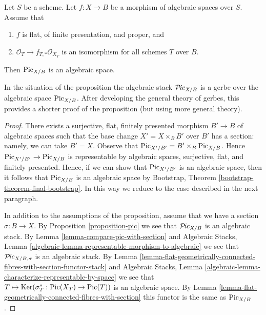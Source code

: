 \begin{proposition}
\label{proposition-pic-functor}
Let $S$ be a scheme. Let $f : X \to B$ be a morphism of algebraic
spaces over $S$. Assume that
\begin{enumerate}
\item $f$ is flat, of finite presentation, and proper, and
\item $\mathcal{O}_T \to f_{T, *}\mathcal{O}_{X_T}$ is an isomorphism
for all schemes $T$ over $B$.
\end{enumerate}
Then $\mathrm{Pic}_{X/B}$ is an algebraic space.
\end{proposition}

\noindent
In the situation of the proposition the algebraic stack
$\mathcal{P}\!\mathit{ic}_{X/B}$ is a gerbe over the algebraic space
$\mathrm{Pic}_{X/B}$. After developing the general
theory of gerbes, this provides a shorter proof of
the proposition (but using more general theory).

\begin{proof}
There exists a surjective, flat, finitely presented morphism
$B' \to B$ of algebraic spaces such that the base change $X' = X \times_B B'$
over $B'$ has a section: namely, we can take $B' = X$.
Observe that $\mathrm{Pic}_{X'/B'} = B' \times_B \mathrm{Pic}_{X/B}$.
Hence $\mathrm{Pic}_{X'/B'} \to \mathrm{Pic}_{X/B}$ is representable
by algebraic spaces, surjective, flat, and finitely presented.
Hence, if we can show that $\mathrm{Pic}_{X'/B'}$ is an algebraic space,
then it follows that $\mathrm{Pic}_{X/B}$
is an algebraic space by Bootstrap, Theorem
\ref{bootstrap-theorem-final-bootstrap}.
In this way we reduce to the case described in the next paragraph.

\medskip\noindent
In addition to the assumptions of the proposition, assume that
we have a section $\sigma : B \to X$. By
Proposition \ref{proposition-pic} we see that
$\mathcal{P}\!\mathit{ic}_{X/B}$ is an algebraic stack.
By Lemma \ref{lemma-compare-pic-with-section} and
Algebraic Stacks, Lemma
\ref{algebraic-lemma-representable-morphism-to-algebraic}
we see that $\mathcal{P}\!\mathit{ic}_{X/B, \sigma}$ is an algebraic stack.
By Lemma
\ref{lemma-flat-geometrically-connected-fibres-with-section-functor-stack}
and Algebraic Stacks, Lemma
\ref{algebraic-lemma-characterize-representable-by-space}
we see that $T \mapsto \mathop{\mathrm{Ker}}(\sigma_T^* : \mathop{\mathrm{Pic}}\nolimits(X_T) \to \mathop{\mathrm{Pic}}\nolimits(T))$
is an algebraic space.
By Lemma \ref{lemma-flat-geometrically-connected-fibres-with-section}
this functor is the same as $\mathrm{Pic}_{X/B}$.
\end{proof}


